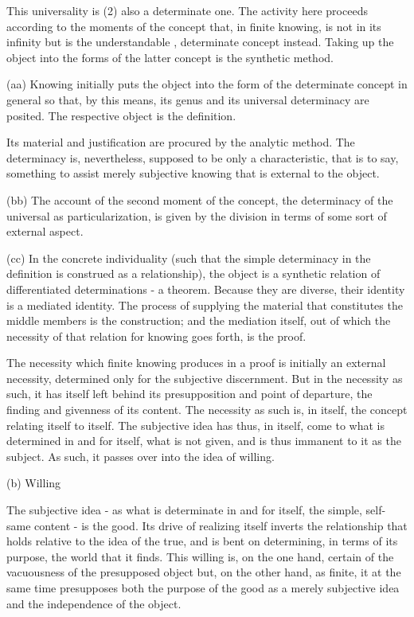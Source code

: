 This universality is (2) also a determinate one.
The activity here proceeds according to the moments of
the concept that, in finite knowing, is not in its infinity
but is the understandable , determinate concept instead.
Taking up the object into the forms of
the latter concept is the synthetic method.

(aa) Knowing initially puts the object into the form of
the determinate concept in general so that, by this means,
its genus and its universal determinacy are posited.
The respective object is the definition.

Its material and justification are procured by the analytic method.
The determinacy is, nevertheless, supposed to be only a characteristic,
that is to say, something to assist merely subjective knowing
that is external to the object.

(bb) The account of the second moment of the concept,
the determinacy of the universal as particularization,
is given by the division in terms of some sort of external aspect.

(cc) In the concrete individuality (such that the simple determinacy in
the definition is construed as a relationship),
the object is a synthetic relation of differentiated determinations - a theorem.
Because they are diverse, their identity is a mediated identity.
The process of supplying the material that constitutes
the middle members is the construction;
and the mediation itself, out of which the necessity of
that relation for knowing goes forth, is the proof.

The necessity which finite knowing produces in a proof
is initially an external necessity,
determined only for the subjective discernment.
But in the necessity as such, it has itself left behind its presupposition
and point of departure, the finding and givenness of its content.
The necessity as such is, in itself, the concept relating itself to itself.
The subjective idea has thus, in itself, come to what is determined in and for itself,
what is not given, and is thus immanent to it as the subject.
As such, it passes over into the idea of willing.

(b) Willing

The subjective idea - as what is determinate in and for itself,
the simple, self-same content - is the good.
Its drive of realizing itself inverts the relationship
that holds relative to the idea of the true, and is bent on determining,
in terms of its purpose, the world that it finds.
This willing is, on the one hand,
certain of the vacuousness of the presupposed object
but, on the other hand, as finite, it at the same time presupposes
both the purpose of the good as a merely subjective idea
and the independence of the object.

